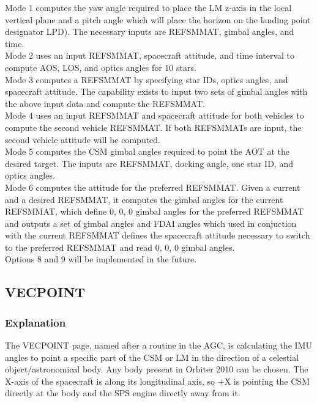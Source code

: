 \documentclass[11pt]{article} %
\begin{document}
Mode 1 computes the yaw angle required to place the LM z-axis in the local vertical plane and a pitch angle which will place the horizon on the landing point designator LPD). The necessary inputs are REFSMMAT, gimbal angles, and time.\\

Mode 2 uses an input REFSMMAT, spacecraft attitude, and time interval to compute AOS, LOS, and optics angles for 10 stars.\\

Mode 3 computes a REFSMMAT by specifying star IDs, optics angles, and spacecraft attitude. The capability exists to input two sets of gimbal angles with the above input data and compute the REFSMMAT.\\

Mode 4 uses an input REFSMMAT and spacecraft attitude for both vehicles to compute the second vehicle REFSMMAT. If both REFSMMATs are input, the second vehicle attitude will be computed.\\

Mode 5 computes the CSM gimbal angles required to point the AOT at the desired target. The inputs are REFSMMAT, docking angle, one star ID, and optics angles.\\

Mode 6 computes the attitude for the preferred REFSMMAT. Given a current and a desired REFSMMAT, it computes the gimbal angles for the current REFSMMAT, which define 0, 0, 0 gimbal angles for the preferred REFSMMAT and outputs a set of gimbal angles and FDAI angles which used in conjuction with the current REFSMMAT defines the spacecraft attitude necessary to switch to the preferred REFSMMAT and read 0, 0, 0 gimbal angles.\\

Options 8 and 9 will be implemented in the future.\\
\newpage
\subsection{VECPOINT}

\subsubsection{Explanation}

The VECPOINT page, named after a routine in the AGC, is calculating the IMU angles to point a specific part of the CSM or LM in the direction of a celestial object/astronomical body. Any body present in Orbiter 2010 can be chosen. The X-axis of the spacecraft is along its longitudinal axis, so +X is pointing the CSM directly at the body and the SPS engine directly away from it.\\
\end{document}
